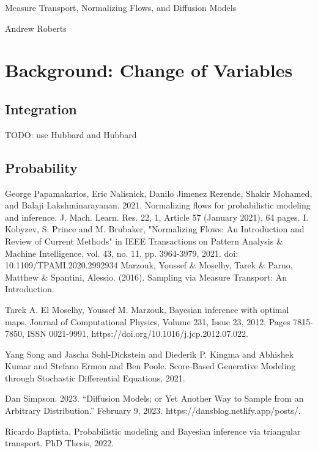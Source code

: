\documentclass[12pt]{article}
\begin{document}
\begin{center}
\Large
Measure Transport, Normalizing Flows, and Diffusion Models 
\end{center}

\begin{flushright}
Andrew Roberts
\end{flushright} 

\section{Background: Change of Variables}

\subsection{Integration}
TODO: use Hubbard and Hubbard 

\subsection{Probability}


\begin{thebibliography}{20}
 George Papamakarios, Eric Nalisnick, Danilo Jimenez Rezende, Shakir Mohamed, and Balaji Lakshminarayanan. 2021. Normalizing flows for probabilistic modeling and inference. J. Mach. Learn. Res. 22, 1, Article 57 (January 2021), 64 pages.
 I. Kobyzev, S. Prince and M. Brubaker, "Normalizing Flows: An Introduction and Review of Current Methods" in IEEE Transactions on Pattern Analysis \& Machine Intelligence, vol. 43, no. 11, pp. 3964-3979, 2021. doi: 10.1109/TPAMI.2020.2992934
 Marzouk, Youssef \& Moselhy, Tarek \& Parno, Matthew \& Spantini, Alessio. (2016). Sampling via Measure Transport: An Introduction. 

 Tarek A. El Moselhy, Youssef M. Marzouk, Bayesian inference with optimal maps, Journal of Computational Physics, Volume 231, Issue 23, 2012, Pages 7815-7850, ISSN 0021-9991, https://doi.org/10.1016/j.jcp.2012.07.022.

 Yang Song and Jascha Sohl-Dickstein and Diederik P. Kingma and Abhishek Kumar and Stefano Ermon and Ben Poole. Score-Based Generative Modeling through Stochastic Differential Equations, 2021. 

 Dan Simpson. 2023. “Diffusion Models; or Yet Another Way to Sample from an Arbitrary Distribution.” February 9, 2023. https://dansblog.netlify.app/posts/.

 Ricardo Baptista, Probabilistic modeling and Bayesian inference via triangular transport. PhD Thesis, 2022. 

\end{thebibliography}
\end{document}
